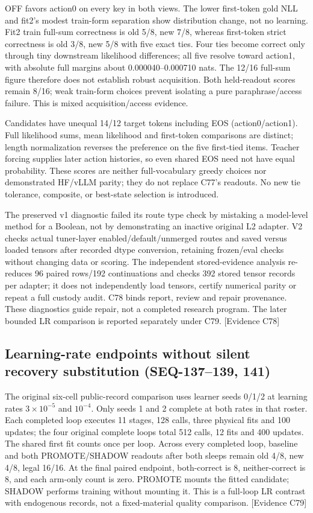 \documentclass[11pt]{article}
\newcommand{\ev}[1]{\textsf{[Evidence #1]}}
\begin{document}
OFF favors action0 on every key in both views. The lower first-token gold NLL
and fit2's modest train-form separation show distribution change, not no
learning. Fit2 train full-sum correctness is old 5/8, new 7/8, whereas first-token
strict correctness is old 3/8, new 5/8 with five exact ties. Four ties become
correct only through tiny downstream likelihood differences; all five resolve
toward action1, with absolute full margins about 0.000040--0.000710 nats. The
12/16 full-sum figure therefore does not establish robust acquisition. Both
held-readout scores remain 8/16; weak train-form choices prevent isolating a
pure paraphrase/access failure. This is mixed acquisition/access evidence.

Candidates have unequal 14/12 target tokens including EOS (action0/action1).
Full likelihood sums, mean likelihood and first-token comparisons are distinct;
length normalization reverses the preference on the five first-tied items.
Teacher forcing supplies later action histories, so even shared EOS need not
have equal probability. These scores are neither full-vocabulary greedy
choices nor demonstrated HF/vLLM parity; they do not replace C77's readouts.
No new tie tolerance, composite, or best-state selection is introduced.

The preserved v1 diagnostic failed its route type check by mistaking a
model-level method for a Boolean, not by demonstrating an inactive original L2
adapter. V2 checks actual tuner-layer enabled/default/unmerged routes and saved
versus loaded tensors after recorded dtype conversion, retaining frozen/eval
checks without changing data or scoring. The independent stored-evidence
analysis re-reduces 96 paired rows/192 continuations and checks 392 stored tensor
records per adapter; it does not independently load tensors, certify numerical
parity or repeat a full custody audit. C78 binds report, review and repair
provenance. These diagnostics guide repair, not a completed research program.
The later bounded LR comparison is reported separately under C79. \ev{C78}


\subsection{Learning-rate endpoints without silent recovery substitution (SEQ-137--139, 141)}
\label{sec:bounded-lr}
The original six-cell public-record comparison uses learner seeds 0/1/2 at
learning rates $3\times10^{-5}$ and $10^{-4}$. Only seeds 1 and 2 complete at
both rates in that roster. Each completed loop executes 11 stages, 128 calls,
three physical fits and 100 updates; the four original complete loops total
512 calls, 12 fits and 400 updates. The shared first fit counts once per loop.
Across every completed loop, baseline and both PROMOTE/SHADOW readouts after
both sleeps remain old 4/8, new 4/8, legal 16/16. At the final paired endpoint,
both-correct is 8, neither-correct is 8, and each arm-only count is zero.
PROMOTE mounts the fitted candidate; SHADOW performs training without mounting
it. This is a full-loop LR contrast with endogenous records, not a fixed-material
quality comparison. \textsf{[Evidence C79]}
\end{document}
